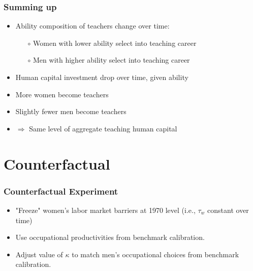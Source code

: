 \documentclass[11pt]{beamer}
\begin{document}

\begin{frame}
\frametitle{Summing up}

\begin{itemize}
    \item Ability composition of teachers change over time:
    \begin{itemize}
				\item[$\circ$] Women with lower ability select into teaching career %
                \item[$\circ$] Men with higher ability select into teaching career %
    \end{itemize}
    \item Human capital investment drop over time, given ability %
    \item More women become teachers
    \item Slightly fewer men become teachers
    \item $\Rightarrow$ Same level of aggregate teaching human capital 
\end{itemize}
\end{frame}

\section{Counterfactual}

\begin{frame}
\frametitle{Counterfactual Experiment}
\begin{itemize}
  \item "Freeze" women's labor market barriers at 1970 level (i.e., $\tau_w$ constant over time)
  \item Use occupational productivities from benchmark calibration.
  \item Adjust value of $\kappa$ to match men's occupational choices from benchmark calibration.
\end{itemize}

\end{frame}
\end{document}
